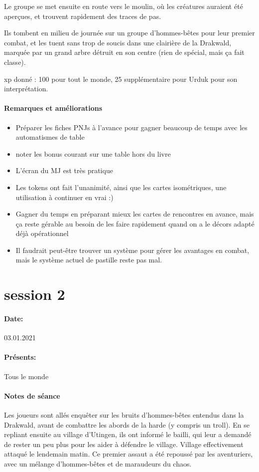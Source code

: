 \documentclass[10pt,a4paper]{book}
\begin{document}
Le groupe se met ensuite en route vers le moulin, où les créatures auraient été aperçues, et trouvent rapidement des traces de pas.

Ils tombent en milieu de journée sur un groupe d'hommes-bêtes pour leur premier combat, et les tuent sans trop de soucis dans une clairière de la Drakwald, marquée par un grand arbre détruit en son centre (rien de spécial, mais ça fait classe).

xp donné : 100 pour tout le monde, 25 supplémentaire pour Urduk pour son interprétation.

\paragraph{Remarques et améliorations} 
\begin{itemize}
\item Préparer les fiches PNJs à l'avance pour gagner beaucoup de temps avec les automatismes de table
\item noter les bonus courant sur une table hors du livre
\item L'écran du MJ est très pratique
\item Les tokens ont fait l'unanimité, ainsi que les cartes isométriques, une utilisation à continuer en vrai :)
\item Gagner du temps en préparant mieux les cartes de rencontres en avance, mais ça reste gérable au besoin de les faire rapidement quand on a le décors adapté déjà opérationnel
\item Il faudrait peut-être trouver un système pour gérer les avantages en combat, mais le système actuel de pastille reste pas mal.
\end{itemize}
\section{session 2}
\paragraph{Date:} 03.01.2021
\paragraph{Présents:}Tous le monde
\paragraph{Notes de séance}
Les joueurs sont allés enquêter sur les bruits d'hommes-bêtes entendus dans la Drakwald, avant de combattre les abords de la harde (y compris un troll). En se repliant ensuite au village d'Utingen, ils ont informé le bailli, qui leur a demandé de rester un peu plus pour les aider à défendre le village. Village effectivement attaqué le lendemain matin. Ce premier assaut a été repoussé par les aventuriers, avec un mélange d'hommes-bêtes et de maraudeurs du chaos.
\end{document}
